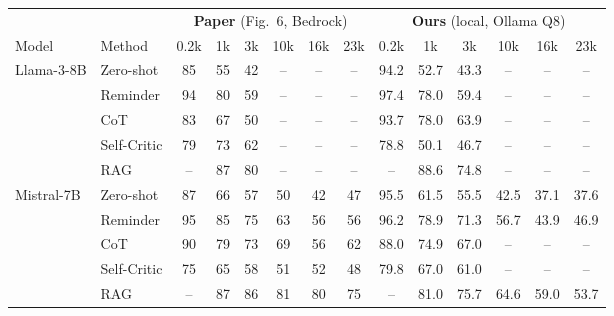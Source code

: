 \begin{tabular}{llcccccc@{\hspace{10pt}}cccccc}
\toprule
 & & \multicolumn{6}{c}{\textbf{Paper} (Fig.\ 6, Bedrock)} & \multicolumn{6}{c}{\textbf{Ours} (local, Ollama Q8)} \\
\cmidrule(lr){3-8}\cmidrule(lr){9-14}
Model & Method & 0.2k & 1k & 3k & 10k & 16k & 23k & 0.2k & 1k & 3k & 10k & 16k & 23k \\
\midrule
Llama-3-8B & Zero-shot & 85 & 55 & 42 & -- & -- & -- & 94.2 & 52.7 & 43.3 & -- & -- & -- \\
 & Reminder & 94 & 80 & 59 & -- & -- & -- & 97.4 & 78.0 & 59.4 & -- & -- & -- \\
 & CoT & 83 & 67 & 50 & -- & -- & -- & 93.7 & 78.0 & 63.9 & -- & -- & -- \\
 & Self-Critic & 79 & 73 & 62 & -- & -- & -- & 78.8 & 50.1 & 46.7 & -- & -- & -- \\
 & RAG & -- & 87 & 80 & -- & -- & -- & -- & 88.6 & 74.8 & -- & -- & -- \\
\midrule
Mistral-7B & Zero-shot & 87 & 66 & 57 & 50 & 42 & 47 & 95.5 & 61.5 & 55.5 & 42.5 & 37.1 & 37.6 \\
 & Reminder & 95 & 85 & 75 & 63 & 56 & 56 & 96.2 & 78.9 & 71.3 & 56.7 & 43.9 & 46.9 \\
 & CoT & 90 & 79 & 73 & 69 & 56 & 62 & 88.0 & 74.9 & 67.0 & -- & -- & -- \\
 & Self-Critic & 75 & 65 & 58 & 51 & 52 & 48 & 79.8 & 67.0 & 61.0 & -- & -- & -- \\
 & RAG & -- & 87 & 86 & 81 & 80 & 75 & -- & 81.0 & 75.7 & 64.6 & 59.0 & 53.7 \\
\bottomrule
\end{tabular}
